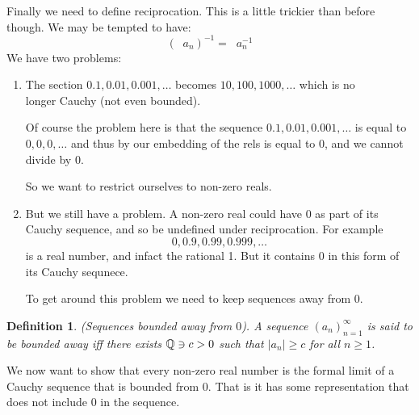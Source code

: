 \documentclass{article}
\newtheorem{definition}{Definition}[subsection]
\newcommand{\Q}{\mathbb{Q}}
\newcommand{\leftin}{\mathrel{\reflectbox{$\in$}}}
\DeclareMathOperator{\infLIM}{\mathrm{LIM}_{n \to \infty}}
\begin{document}
Finally we need to define reciprocation. This is a little 
trickier than before though. We may be tempted to have:
$$
(\infLIM a_n)^{-1} = \infLIM a_n^{-1}
$$
We have two problems:
\begin{enumerate}
	\item The section $0.1, 0.01, 0.001, \dots$ becomes 
		$10, 100, 1000, \dots$ which is no\\ longer 
		Cauchy (not even bounded). 

		Of course the problem here is that 
		the sequence $0.1, 0.01, 0.001, \dots$ is equal
		to $0,0,0, \dots$ and thus by our embedding 
		of the rels is equal to $0$, and we cannot 
		divide by $0$.

		So we want to restrict ourselves to non-zero 
		reals.
	\item But we still have a problem. A non-zero real 
		could have 0 as part of its Cauchy sequence, 
		and so be undefined under reciprocation.
		For example
		$$
		0, 0.9,0.99,0.999, \dots
		$$
		is a real number, and infact the rational 1.
		But it contains $0$ in this form of its 
		Cauchy sequnece.

		To get around this problem we need to 
		keep sequences away from $0$.
\end{enumerate}

\begin{definition}
	(Sequences bounded away from $0$). A sequence
	$(a_n)_{n=1}^\infty$ is said to be bounded away
	iff there exists $\Q \leftin c > 0$ such that 
	$|a_n| \geq c$ for all $n \geq 1$.
\end{definition}

We now want to show that every non-zero real number 
is the formal limit of a Cauchy sequence that is bounded 
from 0. That is it has some representation that does
not include $0$ in the sequence.
\end{document}

